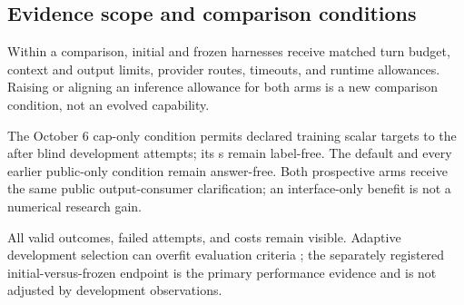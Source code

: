 \subsection{Evidence scope and comparison conditions}

Within a comparison, initial and frozen harnesses receive matched turn
budget, context and output limits, provider routes, timeouts, and runtime
allowances.  Raising or aligning an inference allowance for both arms is a
new comparison condition, not an evolved capability.

The October 6 cap-only condition permits declared training scalar targets to
the \Evolver{} after blind development attempts; its \Worker{}s remain
label-free.  The default and every earlier public-only condition remain
answer-free.  Both prospective arms receive the same public output-consumer
clarification; an interface-only benefit is not a numerical research gain.

All valid outcomes, failed attempts, and costs remain visible.  Adaptive
development selection can overfit evaluation criteria
\citep{cawley2010selectionbias}; the separately registered initial-versus-frozen
endpoint is the primary performance evidence and is not adjusted by
development observations.
